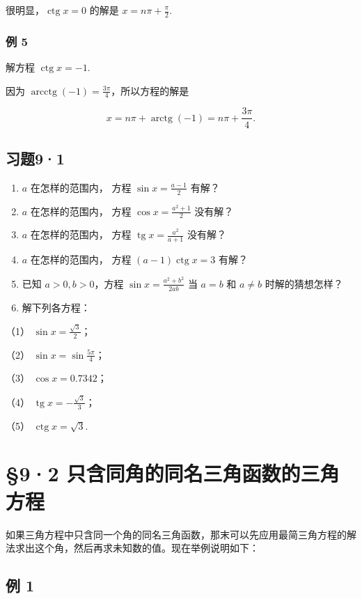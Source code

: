 很明显，\(\operatorname{ctg} x = 0\) 的解是
\(x = n\pi + \frac{\pi}{2}\).

\subsubsection{例 5}

解方程 \(\operatorname{ctg} x = -1\).

 因为
\(\operatorname{arcctg}(-1) = \frac{3\pi}{4}\)，所以方程的解是

\[
x = n \pi + \operatorname{arctg} (- 1) = n \pi + \frac {3 \pi}{4}.
\]

\subsection{习题9·1}

\begin{enumerate}
\item
  \(a\) 在怎样的范围内， 方程 \(\sin x = \frac{a - 1}{2}\) 有解？
\item
  \(a\) 在怎样的范围内， 方程 \(\cos x = \frac{a^2 + 1}{2}\) 没有解？
\item
  \(a\) 在怎样的范围内， 方程
  \(\operatorname{tg} x = \frac{a^2}{a + 1}\) 没有解？
\item
  \(a\) 在怎样的范围内， 方程 \((a - 1)\operatorname{ctg} x = 3\) 有解？
\item
  已知 \(a > 0, b > 0\)，方程 \(\sin x = \frac{a^2 + b^2}{2ab}\) 当
  \(a = b\) 和 \(a \neq b\) 时解的猜想怎样？
\item
  解下列各方程：
\end{enumerate}

（1） \(\sin x = \frac{\sqrt{3}}{2}\)；

（2） \(\sin x = \sin \frac{5\pi}{4}\)；

（3） \(\cos x = 0.7342\)；

（4） \(\operatorname{tg} x = -\frac{\sqrt{3}}{3}\)；

（5） \(\operatorname{ctg} x = \sqrt{3}\).

\section{§9·2 只含同角的同名三角函数的三角方程}

如果三角方程中只含同一个角的同名三角函数，那末可以先应用最简三角方程的解法求出这个角，然后再求未知数的值。现在举例说明如下：

\subsection{例 1}

